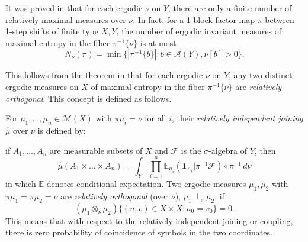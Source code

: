\documentclass{kepart2010}
\theoremstyle{plain}
\theoremstyle{definition}
\theoremstyle{remark}
\theoremstyle{definition}
\numberwithin{equation}{section}
\begin{document}
It was proved in \cite{PetersenQuasShin2003} that for each ergodic
$\nu$ on $Y$, there are only a finite number of relatively maximal
measures over $\nu$.
 In fact, for a 1-block factor map $\pi$ between 1-step
shifts of finite type $X,Y$,
the number of ergodic
  invariant measures of maximal entropy in the fiber
  $\pi^{-1}\{\nu\}$ is at most
\begin{equation} N_\nu(\pi)= \min\{|\pi^{-1}\{b\}|: b \in {{\mathcal A}} (Y), \nu [b]>0\}.
\end{equation}

This follows from the theorem in \cite{PetersenQuasShin2003} that
for each ergodic $\nu$ on $Y$, any two distinct ergodic measures on
$X$ of maximal entropy in the fiber $\pi^{-1}\{\nu\}$ are {{\em
relatively orthogonal}}. This concept is defined as follows.

For $\mu_1 , \dots ,\mu_n \in {{\mathcal M}} (X)$ with $\pi \mu_i= \nu$ for all
$i$, their {\em relatively
  independent joining} $\hat\mu$ over $\nu$ is defined by:

if $A_1, \dots , A_n$ are measurable subsets of $X$ and ${{\mathcal F}}$ is the
$\sigma$-algebra of $Y$, then
 \begin{equation}
    \label{eq:relind}
    \hat\mu(A_1\times\ldots\times A_n)=
    \int_Y \prod_{i=1}^n
    \mathbb E_{\mu_i}({\pmb{1}} _{A_i}|\pi^{-1}\mathcal F)\circ\pi^{-1}
    \,d\nu
  \end{equation}
in which $\mathbb E$ denotes conditional expectation.
Two ergodic measures $\mu_1 , \mu_2$ with $\pi \mu_1 = \pi \mu_2 =
\nu$ are {\em relatively orthogonal} (over $\nu$),
  $\mu_1 \perp_\nu \mu_2$, if
\begin{equation} (\mu_1 \otimes_\nu  \mu_2) \{ (u,v) \in X \times X : u_0
=v_0\}=0. \end{equation} This means that with respect to the relatively
independent joining or coupling, there is {zero probability of
coincidence of symbols in the two coordinates}.
\end{document}
